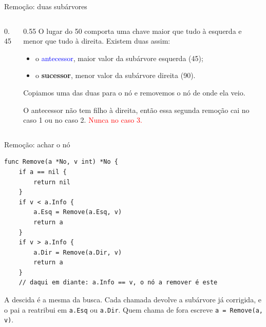 \documentclass{beamer}
\newcommand{\tcb}[1]{\textcolor{blue}{#1}}
\newcommand{\tcr}[1]{\textcolor{red}{#1}}
\begin{document}
\begin{frame}{Remoção: duas subárvores}
  \begin{columns}
    \begin{column}{0.45\textwidth}
      \centering
    \end{column}
    \begin{column}{0.55\textwidth}
      O lugar do 50 comporta uma chave maior que tudo à esquerda e menor que
      tudo à direita. Existem duas assim:
      \begin{itemize}
        \item o \tcb{antecessor}, maior valor da subárvore esquerda (45);
        \item o \textbf{sucessor}, menor valor da subárvore direita (90).
      \end{itemize}

      \vspace{0.3cm}
      Copiamos uma das duas para o nó e removemos o nó de onde ela veio.

      \vspace{0.3cm}
      O antecessor não tem filho à direita, então essa segunda remoção cai no
      caso 1 ou no caso 2. \tcr{Nunca no caso 3.}
    \end{column}
  \end{columns}
\end{frame}

\begin{frame}[fragile]{Remoção: achar o nó}
\begin{verbatim}
func Remove(a *No, v int) *No {
	if a == nil {
		return nil
	}
	if v < a.Info {
		a.Esq = Remove(a.Esq, v)
		return a
	}
	if v > a.Info {
		a.Dir = Remove(a.Dir, v)
		return a
	}
	// daqui em diante: a.Info == v, o nó a remover é este
\end{verbatim}

  \vspace{0.2cm}
  A descida é a mesma da busca. Cada chamada devolve a subárvore já corrigida, e
  o pai a reatribui em \texttt{a.Esq} ou \texttt{a.Dir}. Quem chama de fora
  escreve \texttt{a = Remove(a, v)}.
\end{frame}
\end{document}
